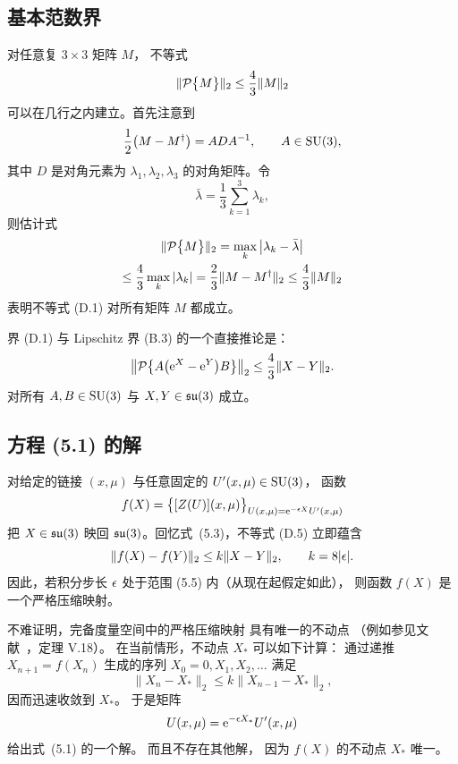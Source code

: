 \subsection{基本范数界}

对任意复 $3\times3$ 矩阵 $M$，
不等式
\begin{equation}
  \|\mathcal{P}\bigl\{M\bigr\}\|_2\leq\frac{4}{3}\|M\|_2
\end{equation}
可以在几行之内建立。首先注意到
\begin{equation}
  \frac{1}{2}\bigl(M-M^{\dagger}\bigr)=A D A^{-1},
  \qquad A\in\mathrm{SU}(3),
\end{equation}
其中 $D$ 是对角元素为 $\lambda_1,\lambda_2,\lambda_3$ 的对角矩阵。令
\begin{equation}
  \bar{\lambda}=\frac{1}{3}\sum_{k=1}^3\lambda_k,
\end{equation}
则估计式
\begin{multline}
  \|\mathcal{P}\bigl\{M\bigr\}\|_2=\max_k
  \left|\lambda_k-\bar{\lambda}\right|
  \\
  \leq\frac{4}{3}\max_k\left|\lambda_k\right|=
  \frac{2}{3}\|M-M^{\dagger}\|_2\leq\frac{4}{3}\|M\|_2
\end{multline}
表明不等式 (D.1) 对所有矩阵 $M$ 都成立。

界 (D.1) 与 Lipschitz 界 (B.3) 的一个直接推论是：
\begin{equation}
  \bigl\|\mathcal{P}\bigl\{A\bigl(\mathrm{e}^X-\mathrm{e}^Y\bigr)B\bigr\}\bigr\|_2\leq
  \frac{4}{3}\|X-Y\|_2.
\end{equation}
对所有 $A,B\in\mathrm{SU}(3)$ 与 $X,Y\in\mathfrak{su}(3)$ 成立。


\subsection{方程 (5.1) 的解}

对给定的链接 $(x,\mu)$ 与任意固定的 $U'(x,\mu)\in\mathrm{SU}(3)$，
函数
\begin{equation}
  f(X)=\bigl\{[Z(U)](x,\mu)\bigr\}_{
  U(x,\mu)=\mathrm{e}^{-\epsilon X}U'(x,\mu)}
\end{equation}
把 $X\in\mathfrak{su}(3)$ 映回 $\mathfrak{su}(3)$。回忆式~(5.3)，不等式
(D.5) 立即蕴含
\begin{equation}
  \|f(X)-f(Y)\|_2\leq k\|X-Y\|_2,
  \qquad k=8|\epsilon|.
\end{equation}
因此，若积分步长 $\epsilon$ 处于范围 (5.5) 内（从现在起假定如此），
则函数 $f(X)$ 是一个严格压缩映射。

不难证明，完备度量空间中的严格压缩映射
具有唯一的不动点
（例如参见文献~\cite{ReedSimonI}，定理 V.18）。
在当前情形，不动点 $X_{*}$ 可以如下计算：
通过递推 $X_{n+1}=f(X_n)$ 生成的序列 $X_0=0,X_1,X_2,\ldots$ 满足
\begin{equation}
  \|X_n-X_{*}\|_2\leq k\|X_{n-1}-X_{*}\|_2,
\end{equation}
因而迅速收敛到 $X_{*}$。
于是矩阵
\begin{equation}
  U(x,\mu)=\mathrm{e}^{-\epsilon X_{*}}U'(x,\mu)
\end{equation}
给出式~(5.1) 的一个解。
而且不存在其他解，
因为 $f(X)$ 的不动点 $X_{*}$ 唯一。


